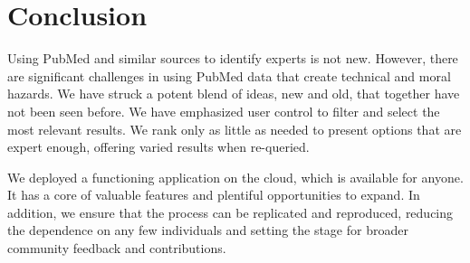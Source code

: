 \section{Conclusion}

Using PubMed and similar sources to identify experts is not new. However, there are significant challenges in using PubMed data that create technical and moral hazards. We have struck a potent blend of ideas, new and old, that together have not been seen before. We have emphasized user control to filter and select the most relevant results. We rank only as little as needed to present options that are expert enough, offering varied results when re-queried. 

We deployed a functioning application on the cloud, which is available for anyone. It has a core of valuable features and plentiful opportunities to expand. In addition, we ensure that the process can be replicated and reproduced, reducing the dependence on any few individuals and setting the stage for broader community feedback and contributions. 